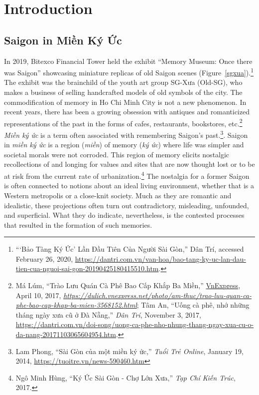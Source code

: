 \chapter{Introduction}\label{intro}
\vi
\section{Saigon in Miền Ký Ức}
\vi In 2019, Bitexco Financial Tower held the exhibit “Memory Museum: Once there was Saigon” showcasing miniature replicas of old Saigon scenes (Figure~\ref{sgxua}).\footnote{“‘Bảo Tàng Ký Ức’ Lần Đầu Tiên Của Người Sài Gòn,” Dân Trí, accessed February 26, 2020, \url{https://dantri.com.vn/van-hoa/bao-tang-ky-uc-lan-dau-tien-cua-nguoi-sai-gon-20190425180415510.htm}.} The exhibit was the brainchild of the youth art group SG-Xưa (Old-SG), who makes a business of selling handcrafted models of old symbols of the city. The commodification of memory in Ho Chi Minh City is not a new phenomenon. In recent years, there has been a growing obsession with antiques and romanticized representations of the past in the forms of cafes, restaurants, bookstores, etc.\footnote{Má Lúm, “Trào Lưu Quán Cà Phê Bao Cấp Khắp Ba Miền,” \url{VnExpress}, April 10, 2017, \textit{\url{https://dulich.vnexpress.net/photo/am-thuc/trao-luu-quan-ca-phe-bao-cap-khap-ba-mien-3568152.html}}; Tâm An, “Uống cà phê, nhớ những tháng ngày xưa cũ ở Đà Nẵng,” \textit{Dân Trí}, November 3, 2017, \url{https://dantri.com.vn/doi-song/uong-ca-phe-nho-nhung-thang-ngay-xua-cu-o-da-nang-20171103065604954.htm}.} \textit{Miền ký ức} is a term often associated with remembering Saigon's past.\footnote{Lam Phong, “Sài Gòn của một miền ký ức,” \textit{Tuổi Trẻ Online}, January 19, 2014, \url{https://tuoitre.vn/news-590460.htm}}. Saigon in \textit{miền ký ức} is a region (\textit{miền}) of memory (\textit{ký ức}) where life was simpler and societal morals were not corroded. This region of memory elicits nostalgic recollections of and longing for values and sites that are now thought lost or to be at risk from the current rate of urbanization.\footnote{Ngô Minh Hùng, “Ký Ức Sài Gòn - Chợ Lớn Xưa,” \textit{Tạp Chí Kiến Trúc}, 2017.} The nostalgia for a former Saigon is often connected to notions about an ideal living environment, whether that is a Western metropolis or a close-knit society. Much as they are romantic and idealistic, these projections often turn out contradictory, misleading, unfounded, and superficial. What they do indicate, nevertheless, is the contested processes that resulted in the formation of such memories.
\en

